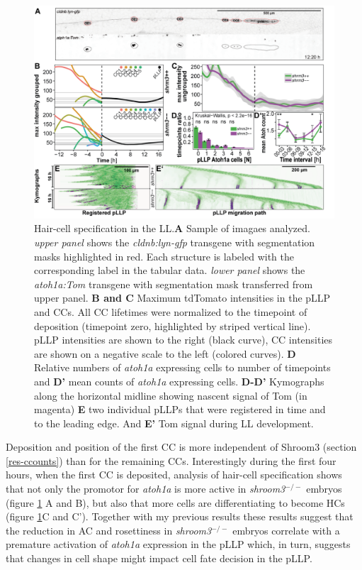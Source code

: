 \documentclass[11pt,singlespacinge,twoside]{reedthesis} %
\theoremstyle{definition}
\theoremstyle{definition}
\theoremstyle{definition}
\theoremstyle{remark}
\begin{document}
\begin{figure}

{\centering \includegraphics[width=0.95\linewidth]{figures/results/05_atoh/ato-tom} 

}

\caption[Hair-cell specification in the LL]{Hair-cell specification in the LL.\textbf{A} Sample of imagaes analyzed. \emph{upper panel} shows the \emph{cldnb:lyn-gfp} transgene with segmentation masks highlighted in red. Each structure is labeled with the corresponding label in the tabular data. \emph{lower panel} shows the \emph{atoh1a:Tom} transgene with segmentation mask transferred from upper panel. \textbf{B and C} Maximum tdTomato intensities in the pLLP and CCs. All CC lifetimes were normalized to the timepoint of deposition (timepoint zero, highlighted by striped vertical line). pLLP intensities are shown to the right (black curve), CC intensities are shown on a negative scale to the left (colored curves). \textbf{D} Relative numbers of \emph{atoh1a} expressing cells to number of timepoints and \textbf{D'} mean counts of \emph{atoh1a} expressing cells. \textbf{D-D'} Kymographs along the horizontal midline showing nascent signal of Tom (in magenta) \textbf{E} two individual pLLPs that were registered in time and to the leading edge. And \textbf{E'} Tom signal during LL development.}\label{fig:hctl}
\end{figure}
Deposition and position of the first CC is more independent of Shroom3 (section \ref{res-ccounts}) than for the remaining CCs. Interestingly during the first four hours, when the first CC is deposited, analysis of hair-cell specification shows that not only the promotor for \emph{atoh1a} is more active in \emph{shroom3}\(^{-/-}\) embryos (figure \ref{fig:hctl} A and B), but also that more cells are differentiating to become HCs (figure \ref{fig:hctl}C and C'). Together with my previous results these results suggest that the reduction in AC and rosettiness in \emph{shroom3}\(^{-/-}\) embryos correlate with a premature activation of \emph{atoh1a} expression in the pLLP which, in turn, suggests that changes in cell shape might impact cell fate decision in the pLLP.
\end{document}
